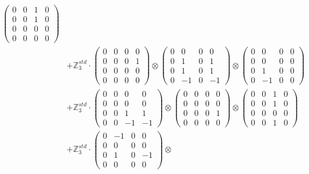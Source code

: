 \documentclass{article}
\begin{document}
{\begin{align}
            \begin{pmatrix} 0 & 0 & 1 & 0 \\ 0 & 0 & 1 & 0 \\ 0 & 0 & 0 & 0 \\ 0 & 0 & 0 & 0 \end{pmatrix} \\ 
        &+ \label{Rs16_Rc11_Solutions_Solution_6-c20} \mathbb{Z}_3^{std} \cdot 
            \begin{pmatrix} 0 & 0 & 0 & 0 \\ 0 & 0 & 0 & 1 \\ 0 & 0 & 0 & 0 \\ 0 & 0 & 0 & 0 \end{pmatrix} \otimes 
            \begin{pmatrix} 0 & 0 & 0 & 0 \\ 0 & 1 & 0 & 1 \\ 0 & 1 & 0 & 1 \\ 0 & -1 & 0 & -1 \end{pmatrix} \otimes 
            \begin{pmatrix} 0 & 0 & 0 & 0 \\ 0 & 0 & 0 & 0 \\ 0 & 1 & 0 & 0 \\ 0 & -1 & 0 & 0 \end{pmatrix} \\ 
        &+ \label{Rs16_Rc11_Solutions_Solution_6-c21} \mathbb{Z}_3^{std} \cdot 
            \begin{pmatrix} 0 & 0 & 0 & 0 \\ 0 & 0 & 0 & 0 \\ 0 & 0 & 1 & 1 \\ 0 & 0 & -1 & -1 \end{pmatrix} \otimes 
            \begin{pmatrix} 0 & 0 & 0 & 0 \\ 0 & 0 & 0 & 0 \\ 0 & 0 & 0 & 1 \\ 0 & 0 & 0 & 0 \end{pmatrix} \otimes 
            \begin{pmatrix} 0 & 0 & 1 & 0 \\ 0 & 0 & 1 & 0 \\ 0 & 0 & 0 & 0 \\ 0 & 0 & 1 & 0 \end{pmatrix} \\ 
        &+ \label{Rs16_Rc11_Solutions_Solution_6-c22} \mathbb{Z}_3^{std} \cdot 
            \begin{pmatrix} 0 & -1 & 0 & 0 \\ 0 & 0 & 0 & 0 \\ 0 & 1 & 0 & -1 \\ 0 & 0 & 0 & 0 \end{pmatrix} \otimes 

\end{align}}
\end{document}
